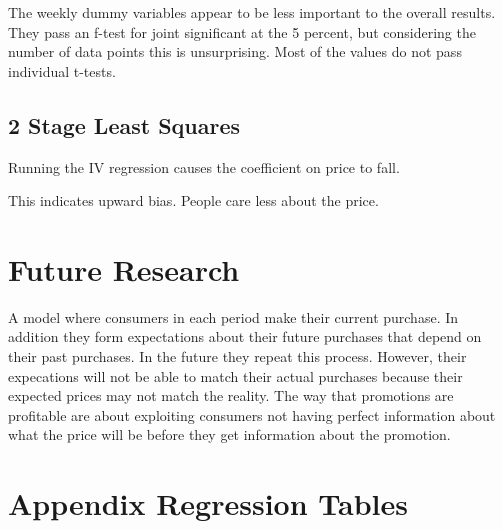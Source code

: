 \documentclass{article}
\begin{document}
The weekly dummy variables appear to be less important to the overall results. They pass an f-test for joint significant at the 5 percent, but considering the number of data points this is unsurprising. Most of the values do not pass individual t-tests.

\subsection{2 Stage Least Squares}

Running the IV regression causes the coefficient on price to fall.

This indicates upward bias. People care less about the price.


\section{Future Research}

A model where consumers in each period make their current purchase. In addition they form expectations about their future purchases that depend on their past purchases. In the future they repeat this process. However, their expecations will not be able to match their actual purchases because their expected prices may not match the reality. The way that promotions are profitable are about exploiting consumers not having perfect information about what the price will be before they get information about the promotion.


{}


\appendix

\section{Appendix Regression Tables}
\end{document}
